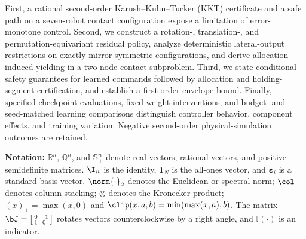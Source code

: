First, a rational second-order Karush--Kuhn--Tucker (KKT) certificate and a safe path on a seven-robot contact configuration expose a limitation of error-monotone control. Second, we construct a rotation-, translation-, and permutation-equivariant residual policy, analyze deterministic lateral-output restrictions on exactly mirror-symmetric configurations, and derive allocation-induced yielding in a two-node contact subproblem. Third, we state conditional safety guarantees for learned commands followed by allocation and holding-segment certification, and establish a first-order envelope bound. Finally, specified-checkpoint evaluations, fixed-weight interventions, and budget- and seed-matched learning comparisons distinguish controller behavior, component effects, and training variation. Negative second-order physical-simulation outcomes are retained.

\textbf{Notation:} $\mathbb R^n$, $\mathbb Q^n$, and $\mathbb S_+^n$ denote real vectors, rational vectors, and positive semidefinite matrices. $\I_n$ is the identity, $\boldsymbol1_N$ is the all-ones vector, and $\boldsymbol\varepsilon_i$ is a standard basis vector. $\norm{\cdot}_2$ denotes the Euclidean or spectral norm; $\col$ denotes column stacking; $\otimes$ denotes the Kronecker product; $(x)_+=\max(x,0)$ and $\clip(x,a,b)=\min(\max(x,a),b)$. The matrix $\bJ=\left[\begin{smallmatrix}0&-1\\1&0\end{smallmatrix}\right]$ rotates vectors counterclockwise by a right angle, and $\mathbb I(\cdot)$ is an indicator.
